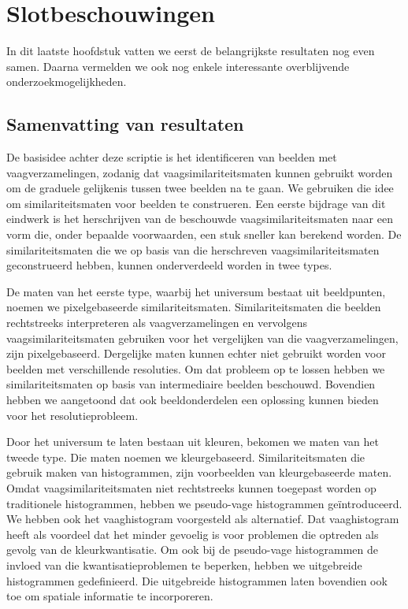 \chapter{Slotbeschouwingen}

In dit laatste hoofdstuk vatten we eerst de belangrijkste resultaten
nog even samen. Daarna vermelden we ook nog enkele interessante overblijvende
onderzoekmogelijkheden.

\section{Samenvatting van resultaten}

De basisidee achter deze scriptie is het identificeren van beelden
met vaagverzamelingen, zodanig dat vaagsimilariteitsmaten kunnen gebruikt worden
om de graduele gelijkenis tussen twee beelden na te gaan. 
We gebruiken die idee om similariteitsmaten voor beelden te construeren.
Een eerste bijdrage van dit eindwerk is het herschrijven van de beschouwde
vaagsimilariteitsmaten naar een vorm die, onder bepaalde voorwaarden, een stuk
sneller kan berekend worden. 
De similariteitsmaten die we op basis van die herschreven vaagsimilariteitsmaten
geconstrueerd hebben, kunnen onderverdeeld worden in twee types. 

De maten van het eerste type, waarbij het universum bestaat uit beeldpunten, 
noemen we pixelgebaseerde similariteitsmaten. Similariteitsmaten die 
beelden rechtstreeks interpreteren als vaagverzamelingen en vervolgens 
vaagsimilariteitsmaten gebruiken voor het vergelijken van die vaagverzamelingen, 
zijn pixelgebaseerd. Dergelijke maten kunnen echter niet gebruikt worden voor 
beelden met verschillende resoluties. Om dat probleem op te lossen hebben we 
similariteitsmaten op basis van intermediaire beelden beschouwd. Bovendien 
hebben we aangetoond dat ook beeldonderdelen een oplossing kunnen bieden voor 
het resolutieprobleem. 

Door het universum te laten bestaan uit kleuren, bekomen we maten van het tweede
type. Die maten noemen we kleurgebaseerd. Similariteitsmaten
die gebruik maken van histogrammen, zijn voorbeelden van kleurgebaseerde 
maten. Omdat vaagsimilariteitsmaten niet rechtstreeks kunnen
toegepast worden op traditionele histogrammen, hebben we pseudo-vage histogrammen
ge\"introduceerd. We hebben ook het vaaghistogram voorgesteld als alternatief.
Dat vaaghistogram heeft als voordeel dat het minder gevoelig is voor
problemen die optreden als gevolg van de kleurkwantisatie. Om ook bij de pseudo-vage
histogrammen de invloed van die kwantisatieproblemen te beperken, hebben we 
uitgebreide histogrammen gedefinieerd. Die uitgebreide histogrammen laten bovendien
ook toe om spatiale informatie te incorporeren.

